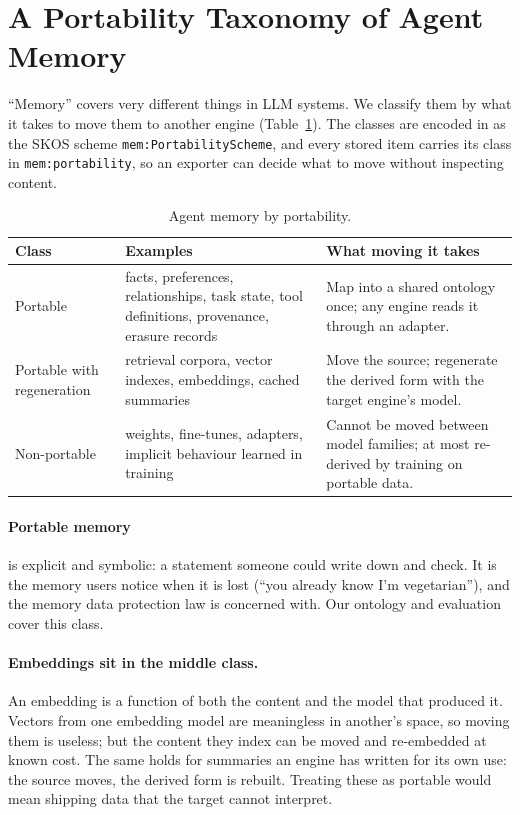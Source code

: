\section{A Portability Taxonomy of Agent Memory}\label{sec:taxonomy}

``Memory'' covers very different things in LLM systems. We classify them by what it takes to
move them to another engine (Table~\ref{tab:taxonomy}). The classes are encoded in \memcore as
the SKOS scheme \texttt{mem:PortabilityScheme}, and every stored item carries its class in
\texttt{mem:portability}, so an exporter can decide what to move without inspecting content.

\begin{table}[t]
\centering
\caption{Agent memory by portability.}\label{tab:taxonomy}
\begin{tabular}{@{}p{2.6cm}p{4.4cm}p{4.6cm}@{}}
\toprule
Class & Examples & What moving it takes \\
\midrule
Portable & facts, preferences, relationships, task state, tool definitions, provenance, erasure
  records & Map into a shared ontology once; any engine reads it through an adapter. \\
Portable with regeneration & retrieval corpora, vector indexes, embeddings, cached summaries &
  Move the source; regenerate the derived form with the target engine's model. \\
Non-portable & weights, fine-tunes, adapters, implicit behaviour learned in training & Cannot be
  moved between model families; at most re-derived by training on portable data. \\
\bottomrule
\end{tabular}
\end{table}

\paragraph{Portable memory} is explicit and symbolic: a statement someone could write down and
check. It is the memory users notice when it is lost (``you already know I'm vegetarian''), and
the memory data protection law is concerned with. Our ontology and evaluation cover this class.

\paragraph{Embeddings sit in the middle class.} An embedding is a function of both the content
and the model that produced it. Vectors from one embedding model are meaningless in another's
space, so moving them is useless; but the content they index can be moved and re-embedded at
known cost. The same holds for summaries an engine has written for its own use: the source
moves, the derived form is rebuilt. Treating these as portable would mean shipping data that the
target cannot interpret.

